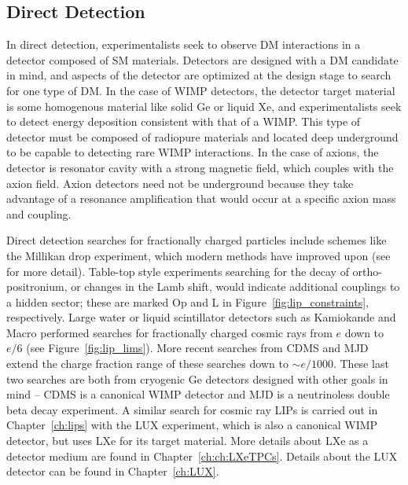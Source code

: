 \subsection{Direct Detection}
In direct detection, experimentalists seek to observe \ac{DM} interactions in a detector composed of \ac{SM} materials. Detectors are designed with a \ac{DM} candidate in mind, and aspects of the detector are optimized at the design stage to search for one type of \ac{DM}. In the case of \ac{WIMP} detectors, the detector target material is some homogenous material like solid Ge or liquid Xe, and experimentalists seek to detect energy deposition consistent with that of a \ac{WIMP}. This type of detector must be composed of radiopure materials and located deep underground to be capable to detecting rare \ac{WIMP} interactions. In the case of axions, the detector is resonator cavity with a strong magnetic field, which couples with the axion field. Axion detectors need not be underground because they take advantage of a resonance amplification that would occur at a specific axion mass and coupling. 

Direct detection searches for fractionally charged particles include schemes like the Millikan drop experiment, which modern methods have improved upon (see \cite{Perl2009} for more detail). Table-top style experiments searching for the decay of ortho-positronium, or changes in the Lamb shift, would indicate additional couplings to a hidden sector; these are marked Op and L in Figure~\ref{fig:lip_constraints}, respectively. Large water or liquid scintillator detectors such as Kamiokande and Macro performed searches for fractionally charged cosmic rays from $e$ down to $e/6$ (see Figure~\ref{fig:lip_lims}). More recent searches from \ac{CDMS} and \ac{MJD} extend the charge fraction range of these searches down to $\sim e/1000$. These last two searches are both from cryogenic Ge detectors designed with other goals in mind -- \ac{CDMS} is a canonical \ac{WIMP} detector and \ac{MJD} is a neutrinoless double beta decay experiment. A similar search for cosmic ray \ac{LIP}s is carried out in Chapter~\ref{ch:lips} with the \ac{LUX} experiment, which is also a canonical \ac{WIMP} detector, but uses \ac{LXe} for its target material. More details about \ac{LXe} as a detector medium are found in Chapter~\ref{ch:ch:LXeTPCs}. Details about the \ac{LUX} detector can be found in Chapter~\ref{ch:LUX}.



